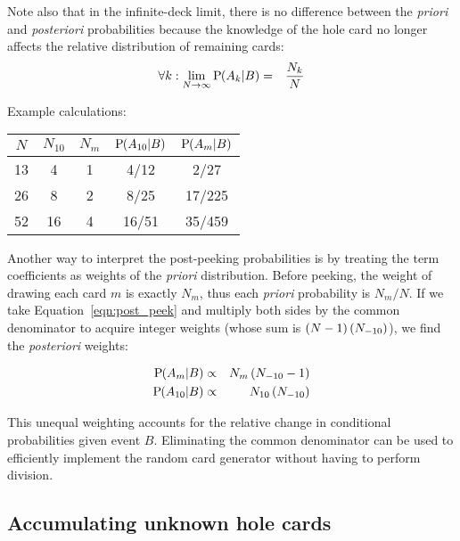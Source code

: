 Note also that in the infinite-deck limit, there is no difference
between the \emph{priori} and \emph{posteriori} probabilities because
the knowledge of the hole card no longer affects the relative distribution of 
remaining cards:
\begin{eqnarray}
\forall k: \lim_{N\rightarrow{}\infty}{\textrm{P}\hspace{-.5ex}\left(A_k|B\right)} &=& \frac{N_k}{N}
\end{eqnarray}

\noindent
Example calculations:
\begin{center}
\begin{tabular}{|c|c|c||c|c|}
\hline
$N$ & $N_{10}$ & $N_m$ & $\textrm{P}\hspace{-.5ex}\left(A_{10}|B\right)$ & $\textrm{P}\hspace{-.5ex}\left(A_m|B\right)$ \\ \hline \hline
13 & 4 & 1 & 4/12 & 2/27 \\ \hline
26 & 8 & 2 & 8/25 & 17/225 \\ \hline
52 & 16 & 4 & 16/51 & 35/459 \\ \hline
\end{tabular}
\end{center}

Another way to interpret the post-peeking probabilities is by treating 
the term coefficients as weights of the \emph{priori} distribution.
Before peeking, the weight of drawing each card $m$ is exactly
$N_m$, thus each \emph{priori} probability is $N_m/N$.
If we take Equation~\ref{eqn:post_peek} and multiply both sides
by the common denominator to acquire integer weights (whose sum is 
$\left(N-1\right)\left(N_{-10}\right)$), we find the \emph{posteriori} weights:

\begin{eqnarray}
\textrm{P}\hspace{-.5ex}\left(A_m|B\right) &\propto& N_m \left(N_{-10}-1\right) \\
\textrm{P}\hspace{-.5ex}\left(A_{10}|B\right) &\propto& N_{10} \left(N_{-10}\right)
\end{eqnarray}

This unequal weighting accounts for the relative change in 
conditional probabilities given event $B$.
Eliminating the common denominator can be used to efficiently implement the
random card generator without having to perform division.

\subsection{Accumulating unknown hole cards}
\label{sec:basic:peeking:accumulate}

